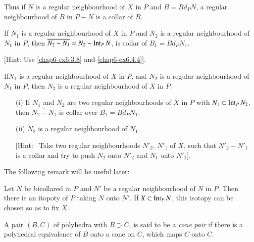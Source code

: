 Thus if $N$ is a regular neighbourhood of $X$ in $P$ and $B=Bd_{P}N$, a regular neighbourhood of $B$ in $\overline{P-N}$ is a collar of $B$.

\begin{ex}\label{chap6-ex6.4.5}
If $N_{1}$ is a regular neighbourhood of $X$ in $P$ and $N_{2}$ is a regular neighbourhood of $N_{1}$ in $P$, then $\overline{N_{2}-N_{1}}=N_{2}-\operatorname{Int}_{P}N$, is collar of $B_{1}=Bd_{P}N_{1}$.

[Hint: Use \ref{chap6-ex6.3.8} and \ref{chap6-ex6.4.4}].
\end{ex}

\begin{ex}\label{chap6-ex6.4.6}
If\pageoriginale $N_{1}$ is a regular neighbourhood of $X$ in $P$, and $N_{2}$ is a regular neighbourhood of $N_{1}$ in $P$, then $N_{2}$ is a regular neighbourhood of $X$ in $P$.
\end{ex}

\begin{ex}\label{chap6-ex6.4.7}
\begin{itemize}
\item[(i)] If $N_{1}$ and $N_{2}$ are two regular neighbourhoods of $X$ in $P$ with $N_{1}\subset \operatorname{Int}_{P}N_{2}$, then $\overline{N_{2}-N_{1}}$ is collar over $B_{1}=Bd_{P}N_{1}$.

\item[(ii)] $N_{2}$ is a regular neighbourhood of $N_{1}$.

[Hint:~ Take two regular neighbourhoods $N'_{2}$, $N'_{1}$ of $X$, such that $N'_{2}-N'_{1}$ is a collar and try to push $N_{2}$ onto $N'_{2}$ and $N_{1}$ onto $N'_{1}$].
\end{itemize}
\end{ex}

The following remark will be useful later:

\begin{ex}\label{chap6-ex6.4.8}
Let $N$ be bicollared in $P$ and $N'$ be a regular neighbourhood of $N$ in $P$. Then there is an itopoty of $P$ taking $N$ onto $N'$. If $X\subset \operatorname{Int}_{P}N$, this isotopy can be chosen so as to fix $X$.
\end{ex}

\begin{definition}\label{chap6-defi6.4.9}
A pair $(B,C)$ of polyhedra with $B\supset C$, is said to be a {\em cone pair} if there is a polyhedral equivalence of $B$ onto a cone on $C$, which maps $C$ onto $C$.
\end{definition}

